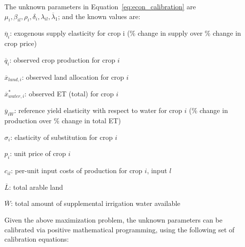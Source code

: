 The unknown parameters in Equation~\ref{eq:econ_calibration} are $\mu _ { i } , \beta _ { i l } , \rho _ { i } , \delta _ { i } , \lambda _ { i l } , \overline { \lambda } _ { 1 }$; and the known values are:

\begin{itemize*}
    \item $\overline { \eta } _ { i }$: exogenous supply elasticity for crop i (\% change in supply over \% change in crop price)
    \item $\overline { q } _ { i }$: observed crop production for crop $i$
    \item $\overline { x } _ { land,i }$: observed land allocation for crop $i$
    \item $\overline { x } _ { water,i} ^{*}$: observed ET (total) for crop $i$
    \item $\overline { y } _ { i W}$: reference yield elasticity with respect to water for crop $i$ (\% change in production over \% change in total ET)
    \item $\sigma_i$: elasticity of substitution for crop $i$
    \item $p_i$: unit price of crop $i$
    \item $c_{il}$: per-unit input costs of production for crop $i$, input $l$
    \item $\overline { L }$: total arable land
    \item $\overline{W}$: total amount of supplemental irrigation water available
\end{itemize*}

Given the above maximization problem, the unknown parameters can be calibrated via positive mathematical programming, using the following set of calibration equations: 

